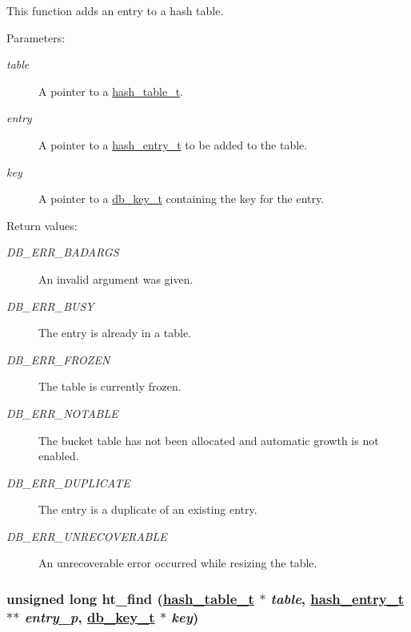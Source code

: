 This function adds an entry to a hash table.\begin{Desc}
\item[Parameters: ]\par
\begin{description}
\item[{\em 
table}]A pointer to a \hyperlink{group__dbprim__hash_a0}{hash\_\-table\_\-t}. \item[{\em 
entry}]A pointer to a \hyperlink{group__dbprim__hash_a1}{hash\_\-entry\_\-t} to be added to the table. \item[{\em 
key}]A pointer to a \hyperlink{group__dbprim_a0}{db\_\-key\_\-t} containing the key for the entry.\end{description}
\end{Desc}
\begin{Desc}
\item[Return values: ]\par
\begin{description}
\item[{\em 
DB\_\-ERR\_\-BADARGS}]An invalid argument was given. \item[{\em 
DB\_\-ERR\_\-BUSY}]The entry is already in a table. \item[{\em 
DB\_\-ERR\_\-FROZEN}]The table is currently frozen. \item[{\em 
DB\_\-ERR\_\-NOTABLE}]The bucket table has not been allocated and automatic growth is not enabled. \item[{\em 
DB\_\-ERR\_\-DUPLICATE}]The entry is a duplicate of an existing entry. \item[{\em 
DB\_\-ERR\_\-UNRECOVERABLE}]An unrecoverable error occurred while resizing the table. \end{description}
\end{Desc}
\hypertarget{group__dbprim__hash_a10}{
\subsubsection[ht\_\-find]{\setlength{\rightskip}{0pt plus 5cm}unsigned long ht\_\-find (\hyperlink{group__dbprim__hash_a0}{hash\_\-table\_\-t} $\ast$ {\em table}, \hyperlink{group__dbprim__hash_a1}{hash\_\-entry\_\-t} $\ast$$\ast$ {\em entry\_\-p}, \hyperlink{group__dbprim_a0}{db\_\-key\_\-t} $\ast$ {\em key})}}
\label{group__dbprim__hash_a10}


